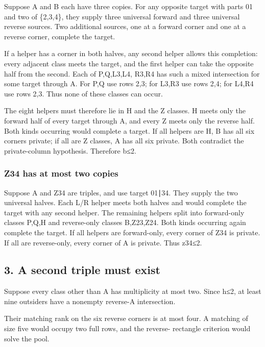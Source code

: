 \documentclass[
  10pt,
]{article}
\begin{document}
Suppose A and B each have three copies. For any opposite target with
parts 01 and two of \{2,3,4\}, they supply three universal forward and
three universal reverse sources. Two additional sources, one at a
forward corner and one at a reverse corner, complete the target.

If a helper has a corner in both halves, any second helper allows this
completion: every adjacent class meets the target, and the first helper
can take the opposite half from the second. Each of P,Q,L3,L4, R3,R4 has
such a mixed intersection for some target through A. For P,Q use rows
2,3; for L3,R3 use rows 2,4; for L4,R4 use rows 2,3. Thus none of these
classes can occur.

The eight helpers must therefore lie in H and the Z classes. H meets
only the forward half of every target through A, and every Z meets only
the reverse half. Both kinds occurring would complete a target. If all
helpers are H, B has all six corners private; if all are Z classes, A
has all six private. Both contradict the private-column hypothesis.
Therefore b≤2.

\hypertarget{z34-has-at-most-two-copies}{%
\subsubsection*{Z34 has at most two
copies}\label{z34-has-at-most-two-copies}}

Suppose A and Z34 are triples, and use target 01∣34. They supply the two
universal halves. Each L/R helper meets both halves and would complete
the target with any second helper. The remaining helpers split into
forward-only classes P,Q,H and reverse-only classes B,Z23,Z24. Both
kinds occurring again complete the target. If all helpers are
forward-only, every corner of Z34 is private. If all are reverse-only,
every corner of A is private. Thus z34≤2.

\hypertarget{a-second-triple-must-exist}{%
\subsection*{3. A second triple must
exist}\label{a-second-triple-must-exist}}

Suppose every class other than A has multiplicity at most two. Since
h≤2, at least nine outsiders have a nonempty reverse-A intersection.

Their matching rank on the six reverse corners is at most four. A
matching of size five would occupy two full rows, and the reverse-
rectangle criterion would solve the pool.
\end{document}
